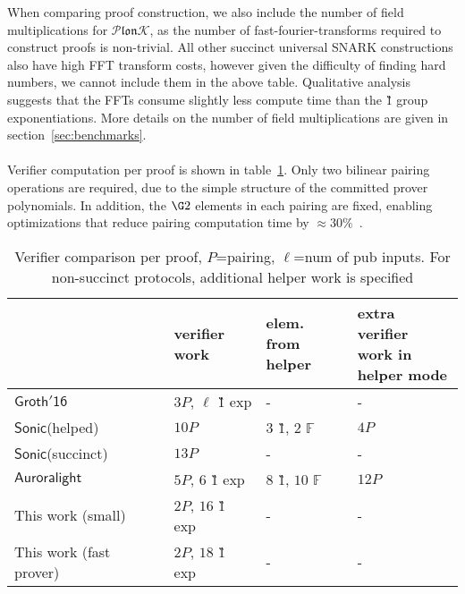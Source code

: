\documentclass[11pt]{article} %
\newcommand{\plonk}{\ensuremath{\mathcal{P} \mathfrak{lon}\mathcal{K}}\xspace}
\newcommand{\F}{\ensuremath{\mathbb F}\xspace}
\newcommand{\sonic}{\ensuremath{\mathsf{Sonic}}\xspace}
\newcommand{\auroralight}{\ensuremath{\mathsf{Auroralight}}\xspace}
\newcommand{\groth}{\ensuremath{\mathsf{Groth'16}}\xspace}
\begin{document}
When comparing proof construction, we also include the number of field multiplications for \plonk, as the number of fast-fourier-transforms required to construct proofs is non-trivial. All other succinct universal SNARK constructions also have high FFT transform costs, however given the difficulty of finding hard numbers, we cannot include them in the above table. Qualitative analysis suggests that the FFTs consume slightly less compute time than the \G1 group exponentiations. More details on the number of field multiplications are given in section~\ref{sec:benchmarks}.
\\
\\
Verifier computation per proof is shown in table~\ref{table:verifier-work}. Only two bilinear pairing operations are required, due to the simple structure of the committed prover polynomials. In addition, the $\G2$ elements in each pairing are fixed, enabling optimizations that reduce pairing computation time by $\approx 30\%$~\cite{CCSD10}.

\begin{table}[!htbp]
	\caption{Verifier comparison per proof, $P$=pairing, $\ell$=num of pub inputs. For non-succinct protocols, additional helper work is specified}
	\centering
	\begin{tabular}{l|l|l|l}
		&  \thead{verifier\\ work} & \thead{elem. from\\ helper} & \thead{extra verifier \\ work in\\ helper mode} \\ \hline
		\groth & $3P$, $\ell$ \G1 exp & - & - \\ \hline
		\sonic (helped) & $10P$ & $3$ \G1, $2$ \F & $4P$ \\ \hline
		\sonic (succinct) & $13P$ & - & - \\ \hline
		\auroralight &  $5P$, $6$ \G1  exp &  $8$ \G1, $10$ \F & $12P$  \\ \hline
		This work (small) & $2P$, $16$ \G1 exp & - & - \\ \hline
		This work (fast prover) & $2P$, $18$ \G1 exp & - & - \\ \hline
	\end{tabular}
\label{table:verifier-work}
\end{table}
\end{document}

